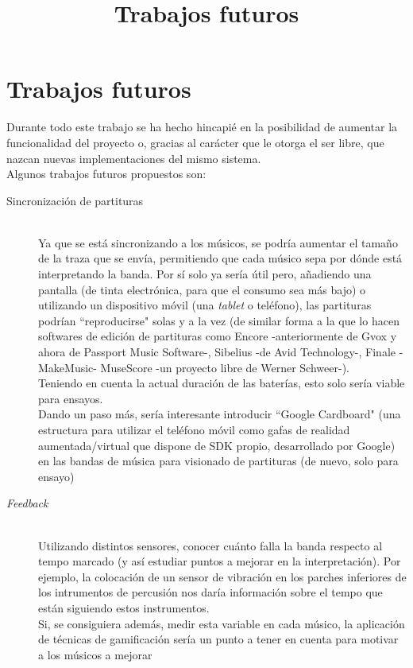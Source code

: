 \section{Trabajos futuros}
\title{Trabajos futuros}
Durante todo este trabajo se ha hecho hincapié en la posibilidad de aumentar la
funcionalidad del proyecto o, gracias al carácter que le otorga el ser libre,
que nazcan nuevas implementaciones del mismo sistema.\\

Algunos trabajos futuros propuestos son:
\begin{description}
    \item[Sincronización de partituras] \hfill \\
      Ya que se está sincronizando a los músicos, se podría aumentar el tamaño de la traza
      que se envía, permitiendo que cada músico sepa por dónde está interpretando la banda.
      Por sí solo ya sería útil pero, añadiendo una pantalla (de tinta electrónica, para que el consumo
      sea más bajo) o utilizando un dispositivo móvil (una \textit{tablet} o teléfono), las partituras
      podrían ``reproducirse" solas y a la vez (de similar forma a la que lo hacen softwares de edición
      de partituras como Encore -anteriormente de Gvox y ahora de Passport Music Software-, Sibelius -de Avid Technology-,
      Finale -MakeMusic- MuseScore -un proyecto libre de Werner Schweer-).\\
      Teniendo en cuenta la actual duración de las baterías, esto solo sería viable para ensayos.\\
      Dando un paso más, sería interesante introducir ``Google Cardboard" \cite{cardboard} (una estructura
      para utilizar el teléfono móvil como gafas de realidad aumentada/virtual que dispone de SDK propio, desarrollado por Google)
      en las bandas de música para visionado de partituras (de nuevo, solo para ensayo)

    \item[\textit{Feedback}] \hfill \\
      Utilizando distintos sensores, conocer cuánto falla la banda respecto al tempo marcado (y así estudiar
      puntos a mejorar en la interpretación). Por ejemplo, la colocación de un sensor de vibración
      en los parches inferiores de los intrumentos de percusión nos daría información sobre el tempo que están
      siguiendo estos instrumentos.\\
      Si, se consiguiera además, medir esta variable en cada músico, la aplicación de técnicas de gamificación
      sería un punto a tener en cuenta para motivar a los músicos a mejorar


\end{description}

